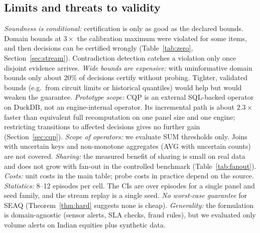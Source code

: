 \documentclass[conference]{IEEEtran}
\newcommand{\seaq}{SEAQ\xspace}
\begin{document}
\subsection{Limits and threats to validity}
\label{sec:limits}
\emph{Soundness is conditional:} certification is only as good as the declared bounds. Domain bounds at
$3\times$ the calibration maximum were violated for some items, and then decisions can be certified wrongly
(Table~\ref{tab:zero}, Section~\ref{sec:stream}). Contradiction detection catches a violation only once
disjoint evidence arrives. \emph{Wide bounds are expensive:} with uninformative domain bounds only about 20\% of
decisions certify without probing. Tighter, validated bounds (e.g.\ from circuit limits or historical quantiles)
would help but would weaken the guarantee. \emph{Prototype scope:} CQP is an external SQL-backed operator on DuckDB, not
an engine-internal operator. Its incremental path is about $2.3\times$ faster than equivalent full recomputation on one panel size and
one engine; restricting transitions to affected decisions gives no further gain (Section~\ref{sec:cqp}). \emph{Scope of operators:} we evaluate SUM thresholds only. Joins with
uncertain keys and non-monotone aggregates (AVG with uncertain counts) are not covered. \emph{Sharing:} the
measured benefit of sharing is small on real data and does not grow with fan-out in the controlled benchmark
(Table~\ref{tab:fanout}). \emph{Costs:} unit costs in the main table; probe costs in practice
depend on the source. \emph{Statistics:} 8--12 episodes per cell. The CIs are over episodes for a single panel
and seed family, and the stream replay is a single seed. \emph{No worst-case guarantee} for \seaq{}
(Theorem~\ref{thm:hard} suggests none is cheap). \emph{Generality:} the formulation is domain-agnostic (sensor
alerts, SLA checks, fraud rules), but we evaluated only volume alerts on Indian equities plus synthetic data.
\end{document}
